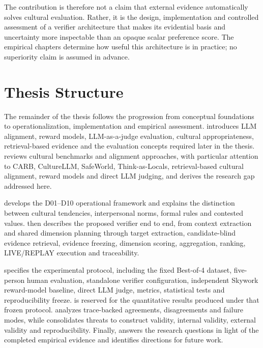 The contribution is therefore not a claim that external evidence automatically solves cultural evaluation. Rather, it is the design, implementation and controlled assessment of a verifier architecture that makes its evidential basis and uncertainty more inspectable than an opaque scalar preference score. The empirical chapters determine how useful this architecture is in practice; no superiority claim is assumed in advance.

\section{Thesis Structure}

The remainder of the thesis follows the progression from conceptual foundations to operationalization, implementation and empirical assessment.  introduces LLM alignment, reward models, LLM-as-a-judge evaluation, cultural appropriateness, retrieval-based evidence and the evaluation concepts required later in the thesis.  reviews cultural benchmarks and alignment approaches, with particular attention to CARB, CultureLLM, SafeWorld, Think-as-Locals, retrieval-based cultural alignment, reward models and direct LLM judging, and derives the research gap addressed here.

 develops the D01--D10 operational framework and explains the distinction between cultural tendencies, interpersonal norms, formal rules and contested values.  then describes the proposed verifier end to end, from context extraction and shared dimension planning through target extraction, candidate-blind evidence retrieval, evidence freezing, dimension scoring, aggregation, ranking, LIVE/REPLAY execution and traceability.

 specifies the experimental protocol, including the fixed Best-of-4 dataset, five-person human evaluation, standalone verifier configuration, independent Skywork reward-model baseline, direct LLM judge, metrics, statistical tests and reproducibility freeze.  is reserved for the quantitative results produced under that frozen protocol.  analyzes trace-backed agreements, disagreements and failure modes, while  consolidates threats to construct validity, internal validity, external validity and reproducibility. Finally,  answers the research questions in light of the completed empirical evidence and identifies directions for future work.

